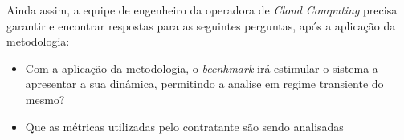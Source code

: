 Ainda assim, a equipe de engenheiro da operadora de \textit{Cloud Computing} precisa garantir e encontrar respostas para as seguintes perguntas, após a aplicação da metodologia:

\begin{itemize}
	\item Com a aplicação da metodologia, o \textit{becnhmark} irá estimular o sistema a apresentar a sua dinâmica, permitindo a analise em regime transiente do mesmo? 
	\item Que as métricas utilizadas pelo contratante são sendo analisadas
\end{itemize}









